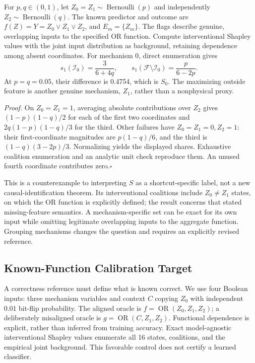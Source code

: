 \documentclass[conference]{IEEEtran}
\begin{document}
For $p,q\in(0,1)$, let $Z_0=Z_1\sim\operatorname{Bernoulli}(p)$ and independently $Z_2\sim\operatorname{Bernoulli}(q)$. The known predictor and outcome are $f(Z)=Y=Z_0\lor Z_1\lor Z_2$, and $E_m=\{Z_m\}$. The flags describe genuine, overlapping inputs to the specified OR function. Compute interventional Shapley values with the joint input distribution as background, retaining dependence among absent coordinates. For mechanism 0, direct enumeration gives
\begin{equation}
 s_1(\mathcal I_0)=\frac{3}{6+4q},\qquad
 s_1(\mathcal F\setminus\mathcal I_0)=\frac{p}{6-2p}.
\end{equation}
At $p=q=0.05$, their difference is 0.4754, which is $S_0$. The maximizing outside feature is another genuine mechanism, $Z_1$, rather than a nonphysical proxy.

\textit{Proof.} On $Z_0=Z_1=1$, averaging absolute contributions over $Z_2$ gives $(1-p)(1-q)/2$ for each of the first two coordinates and $2q(1-p)(1-q)/3$ for the third. Other failures have $Z_0=Z_1=0,Z_2=1$: their first-coordinate magnitudes are $p(1-q)/6$, and the third is $(1-q)(3-2p)/3$. Normalizing yields the displayed shares. Exhaustive coalition enumeration and an analytic unit check reproduce them. An unused fourth coordinate contributes zero.\hfill$\square$

This is a counterexample to interpreting $S$ as a shortcut-specific label, not a new causal-identification theorem. Its interventional coalitions include $Z_0\ne Z_1$ states, on which the OR function is explicitly defined; the result concerns that stated missing-feature semantics. A mechanism-specific set can be exact for its own input while omitting legitimate overlapping inputs to the aggregate function. Grouping mechanisms changes the question and requires an explicitly revised reference.

\subsection{Known-Function Calibration Target}
\label{sec:calibration}
A correctness reference must define what is known correct. We use four Boolean inputs: three mechanism variables and context $C$ copying $Z_0$ with independent 0.01 bit-flip probability. The aligned oracle is $f=\operatorname{OR}(Z_0,Z_1,Z_2)$; a deliberately misaligned oracle is $g=\operatorname{OR}(C,Z_1,Z_2)$. Functional dependence is explicit, rather than inferred from training accuracy. Exact model-agnostic interventional Shapley values enumerate all 16 states, coalitions, and the empirical joint background. This favorable control does not certify a learned classifier.
\end{document}
